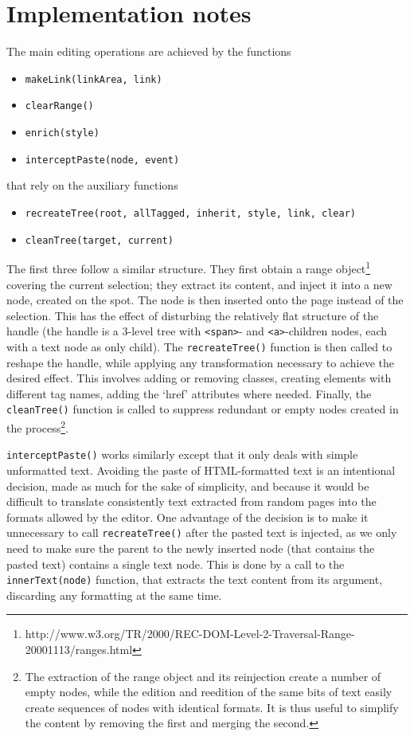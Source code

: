 \documentclass[11pt,a4paper]{article}
\begin{document}
\section{Implementation notes}

The main editing operations are achieved by the functions

\begin{itemize}
\item \texttt{makeLink(linkArea, link)}
\item \texttt{clearRange()}
\item \texttt{enrich(style)}
\item \texttt{interceptPaste(node, event)}
\end{itemize}


\noindent that rely on the auxiliary functions

\begin{itemize}
\item \texttt{recreateTree(root, allTagged, inherit, style, link, clear)}
\item \texttt{cleanTree(target, current)}
\end{itemize}


The first three follow a similar structure. They first obtain a range object\footnote{http://www.w3.org/TR/2000/REC-DOM-Level-2-Traversal-Range-20001113/ranges.html} covering the current selection; they extract its content, and inject it into a new node, created on the spot. The node is then inserted onto the page instead of the selection. This has the effect of disturbing the relatively flat structure of the handle (the handle is a 3-level tree with \texttt{<span>}- and \texttt{<a>}-children nodes, each with a text node as only child). The \texttt{recreateTree()} function is then called to reshape the handle, while applying any transformation necessary to achieve the desired effect. This involves adding or removing classes, creating elements with different tag names, adding the `href' attributes where needed. Finally, the \texttt{cleanTree()} function is called to suppress redundant or empty nodes created in the process\footnote{The extraction of the range object and its reinjection create a number of empty nodes, while the edition and reedition of the same bits of text easily create sequences of nodes with identical formats. It is thus useful to simplify the content by removing the first and merging the second.}.

\texttt{interceptPaste()} works similarly except that it only deals with simple unformatted text. Avoiding the paste of HTML-formatted text is an intentional decision, made as much for the sake of simplicity, and because it would be difficult to translate consistently text extracted from random pages into the formats allowed by the editor. One advantage of the decision is to make it unnecessary to call \texttt{recreateTree()} after the pasted text is injected, as we only need to make sure the parent to the newly inserted node (that contains the pasted text) contains a single text node. This is done by a call to the \texttt{innerText(node)} function, that extracts the text content from its argument, discarding any formatting at the same time. 
\end{document}
